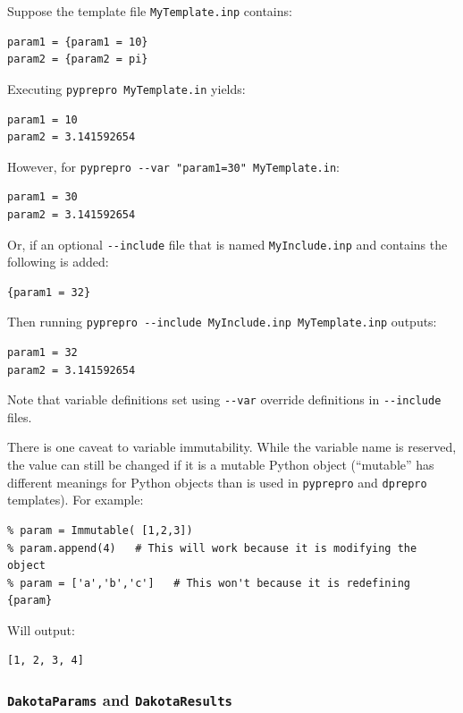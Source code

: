 {Suppose the template file \texttt{MyTemplate.inp} contains:

\begin{verbatim}
param1 = {param1 = 10}
param2 = {param2 = pi}
\end{verbatim}

Executing \texttt{pyprepro MyTemplate.in} yields:

\begin{verbatim}
param1 = 10
param2 = 3.141592654
\end{verbatim}

However, for \texttt{pyprepro\ -\/-var\ "param1=30"\ MyTemplate.in}:

\begin{verbatim}
param1 = 30
param2 = 3.141592654
\end{verbatim}

Or, if an optional \texttt{-\/-include} file that is named 
\texttt{MyInclude.inp} and contains the following is added:

\begin{verbatim}
{param1 = 32}
\end{verbatim}

Then running \texttt{pyprepro\ -\/-include\ MyInclude.inp\ MyTemplate.inp} 
outputs:

\begin{verbatim}
param1 = 32
param2 = 3.141592654
\end{verbatim}

Note that variable definitions set using \texttt{-\/-var} override 
definitions in \texttt{-\/-include} files.

There is one caveat to variable immutability. While the variable name is 
reserved, the value can still be changed if it is a mutable Python object 
(``mutable'' has different meanings for Python objects than is used in 
\texttt{pyprepro} and \texttt{dprepro} templates). For example:

\begin{verbatim}
% param = Immutable( [1,2,3])
% param.append(4)   # This will work because it is modifying the object
% param = ['a','b','c']   # This won't because it is redefining
{param}
\end{verbatim}

Will output:

\begin{verbatim}
[1, 2, 3, 4]
\end{verbatim}

\subsubsection{\texttt{DakotaParams} and \texttt{DakotaResults}}\label{interfaces:params-and-results}

}
